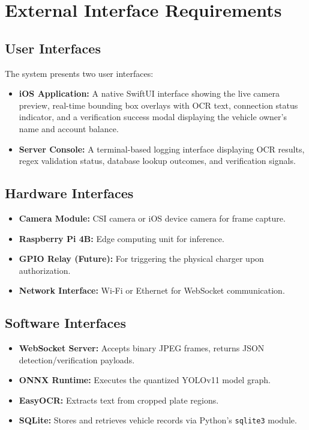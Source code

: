 \documentclass[11pt]{report}
\begin{document}
\section{External Interface Requirements}
\subsection{User Interfaces}
The system presents two user interfaces:
\begin{itemize}
    \item \textbf{iOS Application:} A native SwiftUI interface showing the live camera preview, real-time bounding box overlays with OCR text, connection status indicator, and a verification success modal displaying the vehicle owner's name and account balance.
    \item \textbf{Server Console:} A terminal-based logging interface displaying OCR results, regex validation status, database lookup outcomes, and verification signals.
\end{itemize}

\subsection{Hardware Interfaces}
\begin{itemize}
    \item \textbf{Camera Module:} CSI camera or iOS device camera for frame capture.
    \item \textbf{Raspberry Pi 4B:} Edge computing unit for inference.
    \item \textbf{GPIO Relay (Future):} For triggering the physical charger upon authorization.
    \item \textbf{Network Interface:} Wi-Fi or Ethernet for WebSocket communication.
\end{itemize}

\subsection{Software Interfaces}
\begin{itemize}
    \item \textbf{WebSocket Server:} Accepts binary JPEG frames, returns JSON detection/verification payloads.
    \item \textbf{ONNX Runtime:} Executes the quantized YOLOv11 model graph.
    \item \textbf{EasyOCR:} Extracts text from cropped plate regions.
    \item \textbf{SQLite:} Stores and retrieves vehicle records via Python's \texttt{sqlite3} module.
\end{itemize}
\end{document}
